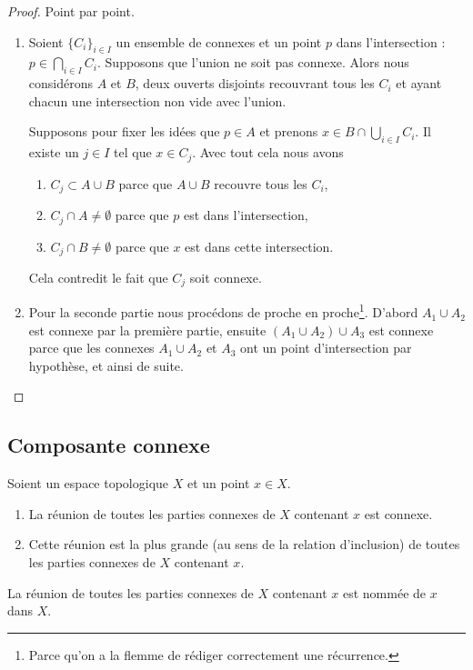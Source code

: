 \begin{proof}
	Point par point.
	\begin{enumerate}
		\item
		      Soient \( \{ C_i \}_{i\in I}\) un ensemble de connexes et un point \( p\) dans l'intersection : \( p\in\bigcap_{i\in I}C_i\). Supposons que l'union ne soit pas connexe. Alors nous considérons \( A\) et \( B\), deux ouverts disjoints recouvrant tous les \( C_i\) et ayant chacun une intersection non vide avec l'union.

		      Supposons pour fixer les idées que \( p\in A\) et prenons \( x\in B\cap\bigcup_{i\in I}C_i\). Il existe un \( j\in I\) tel que \( x\in C_j\). Avec tout cela nous avons
		      \begin{enumerate}
			      \item
			            \( C_j\subset A\cup B\) parce que \(A \cup B\) recouvre tous les \( C_i \),
			      \item
			            \( C_j\cap A\neq \emptyset\) parce que \( p\) est dans l'intersection,
			      \item
			            \( C_j\cap B\neq\emptyset\) parce que \( x\) est dans cette intersection.
		      \end{enumerate}
		      Cela contredit le fait que \( C_j\) soit connexe.
		\item

		      Pour la seconde partie nous procédons de proche en proche\footnote{Parce qu'on a la flemme de rédiger correctement une récurrence.}. D'abord \( A_1\cup A_2\) est connexe par la première partie, ensuite \( (A_1\cup A_2)\cup A_3\) est connexe parce que les connexes \( A_1\cup A_2\) et \( A_3\) ont un point d'intersection par hypothèse, et ainsi de suite.
	\end{enumerate}
\end{proof}

\subsection{Composante connexe}


\begin{propositionDef}        \label{DEFooFHXNooJGUPPn}
	Soient un espace topologique \( X\) et un point \( x\in X\).
	\begin{enumerate}
		\item		\label{ITEMooBZAQooNwuzaS}
		      La réunion de toutes les parties connexes de \( X\) contenant \( x\) est connexe.
		\item
		      Cette réunion est la plus grande (au sens de la relation d'inclusion) de toutes les parties connexes de \( X\) contenant \( x\).
	\end{enumerate}
	La réunion de toutes les parties connexes de \( X\) contenant \( x\) est nommée  de \( x\) dans \( X\).
\end{propositionDef}

